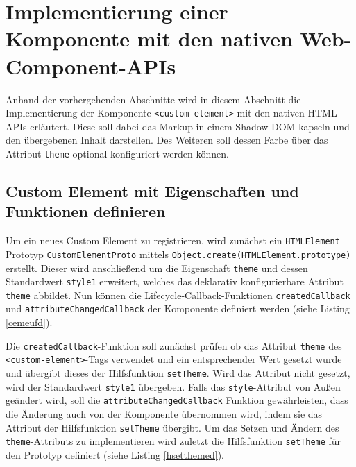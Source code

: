 \section{Implementierung einer Komponente mit den nativen Web-Component-APIs}\label{implementierung-einer-komponente-mit-den-nativen-web-component-apis}

Anhand der vorhergehenden Abschnitte wird in diesem Abschnitt die Implementierung der Komponente \texttt{\textless{}custom-element\textgreater{}} mit den nativen \ac{HTML} APIs erläutert. Diese soll dabei das Markup in einem Shadow \ac{DOM} kapseln und den übergebenen Inhalt darstellen. Des Weiteren soll dessen Farbe über das Attribut \texttt{theme} optional konfiguriert werden können.


\subsection{Custom Element mit Eigenschaften und Funktionen definieren}\label{custom-element-mit-eigenschaften-und-funktionen-definieren}

Um ein neues Custom Element zu registrieren, wird zunächst ein \texttt{\ac{HTML}Element} Prototyp \texttt{CustomElementProto} mittels \texttt{Object.create(\ac{HTML}Element.prototype)} erstellt. Dieser wird anschließend um die Eigenschaft \texttt{theme} und dessen Standardwert \texttt{style1} erweitert, welches das deklarativ konfigurierbare
Attribut \texttt{theme} abbildet. Nun können die Lifecycle-Callback-Funktionen \texttt{createdCallback} und \texttt{attributeChangedCallback} der Komponente definiert werden (siehe Listing \ref{cemeufd}).



Die \texttt{createdCallback}-Funktion soll zunächst prüfen ob das Attribut \texttt{theme} des
\texttt{\textless{}custom-element\textgreater{}}-Tags verwendet und ein entsprechender Wert gesetzt wurde und übergibt dieses der Hilfsfunktion \texttt{setTheme}. Wird das Attribut nicht gesetzt, wird der Standardwert \texttt{style1} übergeben. Falls das \texttt{style}-Attribut von Außen geändert wird, soll die \texttt{attributeChangedCallback} Funktion gewährleisten, dass die Änderung auch von der Komponente übernommen wird, indem sie das Attribut der Hilfsfunktion \texttt{setTheme} übergibt. Um das Setzen und Ändern des \texttt{theme}-Attributs zu implementieren wird zuletzt die Hilfsfunktion \texttt{setTheme} für den Prototyp definiert (siehe Listing \ref{hsetthemed}).


